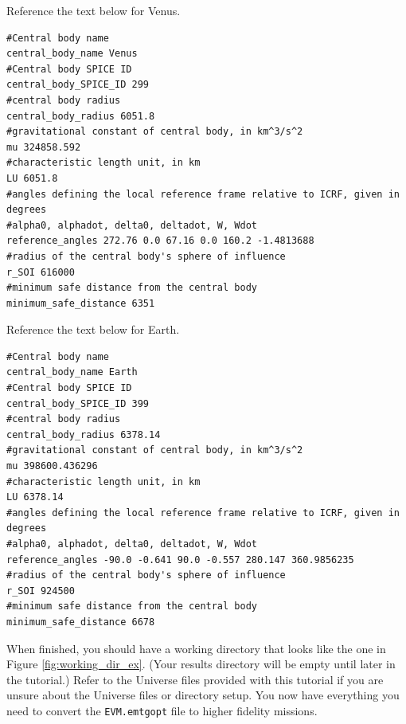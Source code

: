 \documentclass[11pt]{article}
\begin{document}
\noindent Reference the text below for Venus.

\begin{lstlisting}
#Central body name
central_body_name Venus
#Central body SPICE ID
central_body_SPICE_ID 299
#central body radius
central_body_radius 6051.8
#gravitational constant of central body, in km^3/s^2
mu 324858.592
#characteristic length unit, in km
LU 6051.8
#angles defining the local reference frame relative to ICRF, given in degrees
#alpha0, alphadot, delta0, deltadot, W, Wdot
reference_angles 272.76 0.0 67.16 0.0 160.2 -1.4813688
#radius of the central body's sphere of influence
r_SOI 616000
#minimum safe distance from the central body
minimum_safe_distance 6351
\end{lstlisting}

\noindent Reference the text below for Earth.

\begin{lstlisting}
#Central body name
central_body_name Earth
#Central body SPICE ID
central_body_SPICE_ID 399
#central body radius
central_body_radius 6378.14
#gravitational constant of central body, in km^3/s^2
mu 398600.436296
#characteristic length unit, in km
LU 6378.14
#angles defining the local reference frame relative to ICRF, given in degrees
#alpha0, alphadot, delta0, deltadot, W, Wdot
reference_angles -90.0 -0.641 90.0 -0.557 280.147 360.9856235
#radius of the central body's sphere of influence
r_SOI 924500
#minimum safe distance from the central body
minimum_safe_distance 6678
\end{lstlisting}

\noindent When finished, you should have a working directory that looks like the one in Figure \ref{fig:working_dir_ex}. (Your results directory will be empty until later in the tutorial.) Refer to the Universe files provided with this tutorial if you are unsure about the Universe files or directory setup. You now have everything you need to convert the \texttt{EVM.emtgopt} file to higher fidelity missions.
\end{document}
